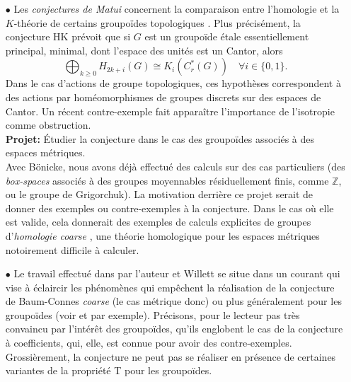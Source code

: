 \documentclass[a4paper,11pt]{article}
\begin{document}
\begin{itemize}
La strat\'egie est ici claire pour la preuve: la classe de complexit\'e nulle satisfaisant l'\'enonc\'e du th\'eor\`eme, il suffit de d\'emontrer que la conjecture est stable pour des d\'ecompositions de groupo\"ides. Essentiellement, cela a d\'ej\`a \'et\'e fait par l'auteur et B\"onicke pour la formule de K\"unneth dans \cite{BonickeDellAiera}. Appliquer la m\^eme id\'ee \`a Baum-Connes est naturel, m\^eme si des difficult\'es techniques devront \^etre surmont\'ees.\\

\item[$\bullet$] Les \textit{conjectures de Matui} concernent la comparaison entre l'homologie et la $K$-th\'eorie de certains groupo\"ides topologiques \cite{matui2016topological}. Plus pr\'ecis\'ement, la conjecture HK pr\'evoit que si $G$ est un groupo\"ide \'etale essentiellement principal, minimal, dont l'espace des unit\'es est un Cantor, alors
\[\bigoplus_{k\geq 0} H_{2k+i}(G) \cong K_i(C^*_r(G))\quad \forall i\in \{0,1\}.\]
Dans le cas d'actions de groupe topologiques, ces hypoth\`eses correspondent \`a des actions par hom\'eomorphismes de groupes discrets sur des espaces de Cantor. Un r\'ecent contre-exemple \cite{scarparo2018homology} fait appara\^itre l'importance de l'isotropie comme obstruction. \\

\textbf{Projet:} \'Etudier la conjecture dans le cas des groupo\"ides associ\'es \`a des espaces m\'etriques. \\

Avec B\"onicke, nous avons d\'ej\`a effectu\'e des calculs sur des cas particuliers (des \textit{box-spaces} associ\'es \`a des groupes moyennables r\'esiduellement finis, comme $\mathbb Z$, ou le groupe de Grigorchuk). La motivation derri\`ere ce projet serait de donner des exemples ou contre-exemples \`a la conjecture. Dans le cas o\`u elle est valide, cela donnerait des exemples de calculs explicites de groupes d'\textit{homologie coarse} \cite{NowakYu}, une th\'eorie homologique pour les espaces m\'etriques notoirement difficile \`a calculer.\\


\item[$\bullet$] Le travail effectu\'e dans \cite{DellWillett} par l'auteur et Willett se situe dans un courant qui vise \`a \'eclaircir les ph\'enom\`enes qui emp\^echent la r\'ealisation de la conjecture de Baum-Connes \textit{coarse} (le cas m\'etrique donc) ou plus g\'en\'eralement pour les groupo\"ides (voir \cite{HigsonLaffSk} et \cite{WillettYu} par exemple). Pr\'ecisons, pour le lecteur pas tr\`es convaincu par l'int\'er\^et des groupo\"ides, qu'ils englobent le cas de la conjecture \`a coefficients, qui, elle, est connue pour avoir des contre-exemples. Grossi\`erement, la conjecture ne peut pas se r\'ealiser en pr\'esence de certaines variantes de la propri\'et\'e T pour les groupo\"ides. \\ 


\end{itemize}
\end{document}
